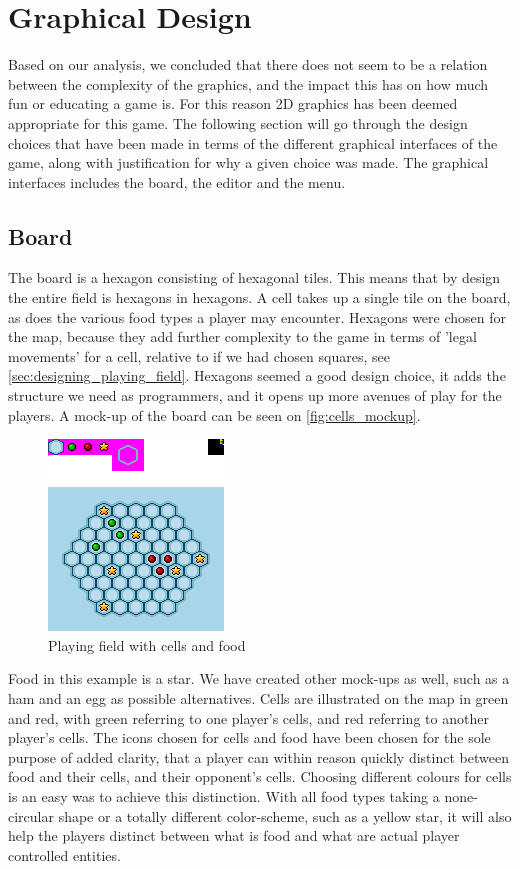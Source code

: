 \section{Graphical Design}
\label{sec:graphical_design}

Based on our analysis, we concluded that there does not seem to be a relation between the complexity of the graphics, and the impact this has on how much fun or educating a game is.
For this reason 2D graphics has been deemed appropriate for this game.
The following section will go through the design choices that have been made in terms of the different graphical interfaces of the game, along with justification for why a given choice was made. The graphical interfaces includes the board, the editor and the menu.

\subsection{Board}
The board is a hexagon consisting of hexagonal tiles.
This means that by design the entire field is hexagons in hexagons. 
A cell takes up a single tile on the board, as does the various food types a player may encounter.
Hexagons were chosen for the map, because they add further complexity to the game in terms of 'legal movements' for a cell, relative to if we had chosen squares, see \autoref{sec:designing_playing_field}.
Hexagons seemed a good design choice, it adds the structure we need as programmers, and it opens up more avenues of play for the players.
A mock-up of the board can be seen on \autoref{fig:cells_mockup}.\newline

\begin{figure}[ht]
	\centering
		\includegraphics{img/cells_mockup.png}
	\caption{Playing field with cells and food}
	\label{fig:cells_mockup}
\end{figure}

Food in this example is a star.
We have created other mock-ups as well, such as a ham and an egg as possible alternatives. 
Cells are illustrated on the map in green and red, with green referring to one player's cells, and red referring to another player's cells.
The icons chosen for cells and food have been chosen for the sole purpose of added clarity, that a player can within reason quickly distinct between food and their cells, and their opponent's cells.
Choosing different colours for cells is an easy was to achieve this distinction.
With all food types taking a none-circular shape or a totally different color-scheme, such as a yellow star, it will also help the players distinct between what is food and what are actual player controlled entities.

